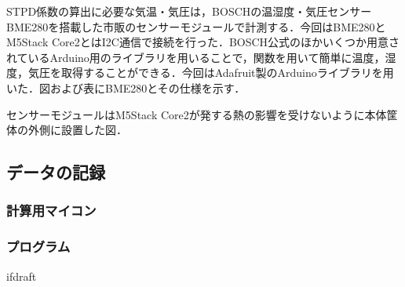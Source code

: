 STPD係数の算出に必要な気温・気圧は，BOSCHの温湿度・気圧センサーBME280を搭載した市販のセンサーモジュールで計測する．今回はBME280とM5Stack Core2とはI2C通信で接続を行った．BOSCH公式のほかいくつか用意されているArduino用のライブラリを用いることで，関数を用いて簡単に温度，湿度，気圧を取得することができる．今回はAdafruit製のArduinoライブラリを用いた．図および表にBME280とその仕様を示す．

センサーモジュールはM5Stack Core2が発する熱の影響を受けないように本体筐体の外側に設置した図．

\subsection{データの記録}

\subsubsection{計算用マイコン}

\subsubsection{プログラム}

\expandafter\ifx\csname ifdraft\endcsname\relax
  
\fi
